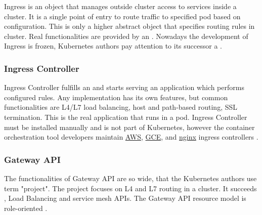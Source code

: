 Ingress is an object that manages outside cluster access to services inside a cluster. It is a single point of entry to route traffic to specified pod based on configuration. This is only a higher abstract object that specifies routing rules in cluster. Real functionalities are provided by an \textit{}. Nowadays the development of Ingress is frozen, Kubernetes authors pay attention to its successor a \textit{} \cite{KubernetesIngress}.

\subsubsection{Ingress Controller}
\label{ingresscontroller}

Ingress Controller fulfills an \textit{} and starts serving an application which performs configured rules. Any implementation has its own features, but common functionalities are L4/L7 load balancing, host and path-based routing, SSL termination. This is the real application that runs in a pod. Ingress Controller must be installed manually and is not part of Kubernetes, however the container orchestration tool developers maintain \href{https://github.com/kubernetes-sigs/aws-load-balancer-controller#readme}{AWS}, \href{https://github.com/kubernetes/ingress-gce/blob/master/README.md#readme}{GCE}, and \href{https://github.com/kubernetes/ingress-nginx/blob/main/README.md#readme}{nginx} ingress controllers \cite{KubernetesIngress}\cite{KubernetesIngressControllers}. 


\subsubsection{Gateway API}
\label{gatewayapi}

The functionalities of Gateway API are so wide, that the Kubernetes authors use term "project". The project focuses on L4 and L7 routing in a cluster. It succeeds \textit{}, Load Balancing and service mesh APIs. The Gateway API resource model is role-oriented \cite{KubernetesGatewayAPI}.

